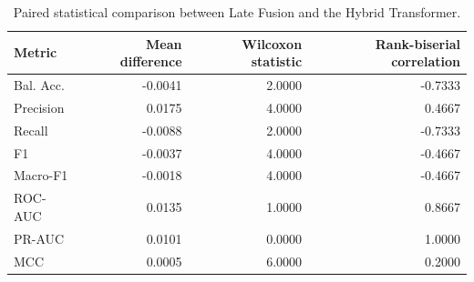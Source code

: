 \begin{table}[t]
\centering
\small
\caption{Paired statistical comparison between Late Fusion and the Hybrid Transformer.}
\label{tab:paired-statistics}
\begin{tabular}{lrrr}
\toprule
Metric & Mean difference & Wilcoxon statistic & Rank-biserial correlation \\
\midrule
Bal. Acc. & -0.0041 & 2.0000 & -0.7333 \\
Precision & 0.0175 & 4.0000 & 0.4667 \\
Recall & -0.0088 & 2.0000 & -0.7333 \\
F1 & -0.0037 & 4.0000 & -0.4667 \\
Macro-F1 & -0.0018 & 4.0000 & -0.4667 \\
ROC-AUC & 0.0135 & 1.0000 & 0.8667 \\
PR-AUC & 0.0101 & 0.0000 & 1.0000 \\
MCC & 0.0005 & 6.0000 & 0.2000 \\
\bottomrule
\end{tabular}
\end{table}

